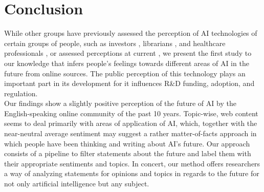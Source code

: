 \section{Conclusion}
While other groups have previously assessed the perception of AI technologies of certain groups of people, such as investors \citep{manrai2022investor}, librarians \citep{hervieux2021perceptions}, and healthcare professionals \citep{castagno2020perceptions}, or assessed perceptions at current \citep{sankaran2021exploring}, we present the first study to our knowledge that infers people’s feelings towards different areas of AI in the future from online sources. 
The public perception of this technology plays an important part in its development for it influences R\&D funding, adoption, and regulation. \\
Our findings show a slightly positive perception of the future of AI by the English-speaking online community of the past 10 years. Topic-wise, web content seems to deal primarily with areas of application of AI, which, together with the near-neutral average sentiment may suggest a rather matter-of-facts approach in which people have been thinking and writing about AI’s future.
Our approach consists of a pipeline to filter statements about the future and label them with their appropriate sentiments and topics.
In concert, our method offers researchers a way of analyzing statements for opinions and topics in regards to the future for not only artificial intelligence but any subject.